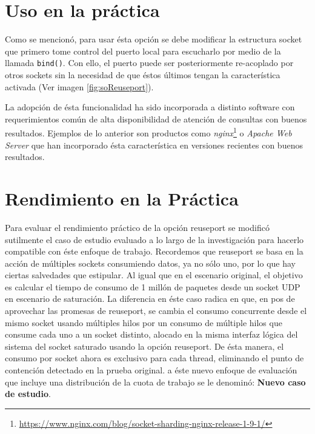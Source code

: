 \section{Uso en la práctica}
Como se mencionó, para usar ésta opción se debe modificar la estructura socket que primero tome control del puerto local para escucharlo por medio de la llamada \verb=bind()=. Con ello, el puerto puede ser posteriormente re-acoplado por otros sockets sin la necesidad de que éstos últimos tengan la característica activada (Ver imagen \ref{fig:soReuseport}).

La adopción de ésta funcionalidad ha sido incorporada a distinto software con requerimientos común de alta disponibilidad de atención de consultas con buenos resultados. Ejemplos de lo anterior son productos como \emph{nginx}\footnote{\url{https://www.nginx.com/blog/socket-sharding-nginx-release-1-9-1/}} o \emph{Apache Web Server} \cite{paper:apache} que han incorporado ésta característica en versiones recientes con buenos resultados.


\section{Rendimiento en la Práctica}
Para evaluar el rendimiento práctico de la opción reuseport se modificó sutilmente el caso de estudio evaluado a lo largo de la investigación para hacerlo compatible con éste enfoque de trabajo. Recordemos que reuseport se basa en la acción de múltiples sockets consumiendo datos, ya no sólo uno, por lo que hay ciertas salvedades que estipular. Al igual que en el escenario original, el objetivo es calcular el tiempo de consumo de 1 millón de paquetes desde un socket UDP en escenario de saturación. La diferencia en éste caso radica en que, en pos de aprovechar las promesas de reuseport, se cambia el consumo concurrente desde el mismo socket usando múltiples hilos por un consumo de múltiple hilos que consume cada uno a un socket distinto, alocado en la misma interfaz lógica del sistema del socket saturado usando la opción reuseport. De ésta manera, el consumo por socket ahora es exclusivo para cada thread, eliminando el punto de contención detectado en la prueba original. a éste nuevo enfoque de evaluación que incluye una distribución de la cuota de trabajo se le denominó: \textbf{Nuevo caso de estudio}.

